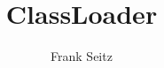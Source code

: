 \documentclass{beamer}
\title{ClassLoader}
\author{Frank Seitz}
\date{}
\begin{document}
\frame{\titlepage}

\end{document}
